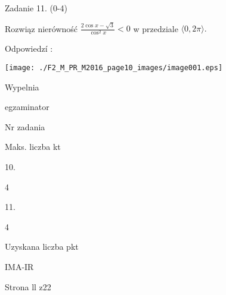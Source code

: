 \documentclass[a4paper,12pt]{article}
\begin{document}
Zadanie 11. (0-4)

Rozwiąz nierówność $\displaystyle \frac{2\cos x-\sqrt{3}}{\cos^{2}x}<0$ w przedziale $\langle 0, 2\pi\rangle.$

Odpowiedzí :
\begin{center}
\texttt{[image: ./F2\_M\_PR\_M2016\_page10\_images/image001.eps]}
\end{center}
Wypelnia

egzaminator

Nr zadania

Maks. liczba kt

10.

4

11.

4

Uzyskana liczba pkt

IMA-IR

Strona ll z22
\end{document}

